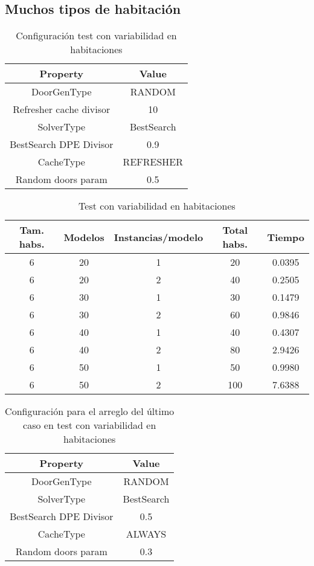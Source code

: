 \subsection{Muchos tipos de habitación}

\begin{table}[H]
\begin{center}
	\begin{tabular}{ | c | c | }
\hline
 		Property & Value \\ \hline
DoorGenType & RANDOM \\ 
Refresher cache divisor & 10 \\ 
SolverType & BestSearch \\ 
BestSearch DPE Divisor & 0.9 \\ 
CacheType & REFRESHER \\ 
Random doors param & 0.5 \\ 
\hline
	\end{tabular}
\end{center}
\caption{Configuración test con variabilidad en habitaciones}
\label{table:cfg-optvarsample}
\end{table}


\begin{table}[H]
\begin{center}
	\begin{tabular}{ | c | c | c | c | c | }
\hline
Tam. habs. & Modelos & Instancias/modelo & Total habs. & Tiempo \\ \hline 
6 & 20 & 1 & 20 & 0.0395 \\ 
6 & 20 & 2 & 40 & 0.2505 \\ 
6 & 30 & 1 & 30 & 0.1479 \\ 
6 & 30 & 2 & 60 & 0.9846 \\ 
6 & 40 & 1 & 40 & 0.4307 \\ 
6 & 40 & 2 & 80 & 2.9426 \\ 
6 & 50 & 1 & 50 & 0.9980 \\ 
6 & 50 & 2 & 100 & 7.6388 \\ 
\hline
	\end{tabular}
\end{center}
\caption{Test con variabilidad en habitaciones}
\label{table:optvarsample}
\end{table}


\begin{table}[H]
\begin{center}
	\begin{tabular}{ | c | c | }
\hline
 		Property & Value \\ \hline
DoorGenType & RANDOM \\ 
SolverType & BestSearch \\ 
BestSearch DPE Divisor & 0.5 \\ 
CacheType & ALWAYS \\ 
Random doors param & 0.3 \\ 
\hline
	\end{tabular}
\end{center}
\caption{Configuración para el arreglo del último caso en test con variabilidad en habitaciones}
\label{table:cfg-optvarfix}
\end{table}


